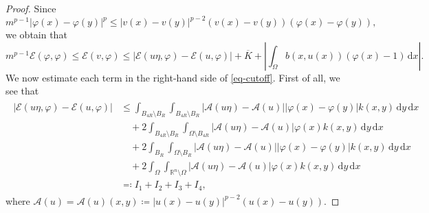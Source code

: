 \documentclass[11pt]{amsart}
\theoremstyle{plain}
\theoremstyle{definition}
\numberwithin{equation}{section}
\begin{document}
\begin{proof}
Since 
\begin{equation*}
m^{p-1}|\varphi(x)-\varphi(y)|^p \leq |v(x)-v(y)|^{p-2}(v(x)-v(y))(\varphi(x)-\varphi(y)),
\end{equation*}
we obtain that
\begin{equation}\label{eq-cutoff}
m^{p-1} \mathcal{E}(\varphi, \varphi) \leq \mathcal{E}(v, \varphi) \leq  |\mathcal{E}(u\eta, \varphi) - \mathcal{E}(u, \varphi)|+\overline{K}+\left|\int_{\Omega} b(x, u(x))(\varphi(x)-1) \,\mathrm{d}x \right|.
\end{equation}
We now estimate each term in the right-hand side of \eqref{eq-cutoff}. First of all, we see that
\begin{align}\label{eq-upper-I1234}
\begin{split}
|\mathcal{E}(u\eta, \varphi)-\mathcal{E}(u, \varphi)|
&\leq \int_{B_{4R} \setminus B_R} \int_{B_{4R} \setminus B_R} |\mathcal{A}(u\eta)-\mathcal{A}(u)| |\varphi(x)-\varphi(y)| k(x, y) \,\mathrm{d}y\,\mathrm{d}x \\
&\quad + 2\int_{B_{4R} \setminus B_R} \int_{\Omega \setminus B_{4R}} |\mathcal{A}(u\eta)-\mathcal{A}(u)| \varphi(x) k(x, y) \,\mathrm{d}y\,\mathrm{d}x \\
&\quad + 2\int_{B_R} \int_{\Omega \setminus B_R} |\mathcal{A}(u\eta)-\mathcal{A}(u)| |\varphi(x)-\varphi(y)| k(x, y) \,\mathrm{d}y\,\mathrm{d}x \\
&\quad + 2\int_\Omega \int_{\mathbb{R}^n \setminus \Omega} |\mathcal{A}(u\eta)-\mathcal{A}(u)| \varphi(x) k(x, y) \,\mathrm{d}y\,\mathrm{d}x \\
&\eqqcolon I_1 + I_2 + I_3 + I_4,
\end{split}
\end{align}
where $\mathcal{A}(u) = \mathcal{A}(u)(x, y)\coloneqq |u(x)-u(y)|^{p-2}(u(x)-u(y))$.


\end{proof}
\end{document}

